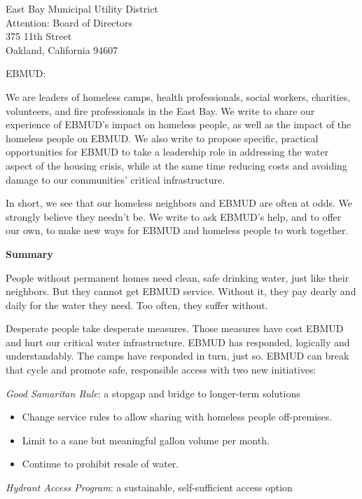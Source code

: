\documentclass[letterpaper]{letter}
\begin{document}
  \begin{letter}{%
    East Bay Municipal Utility District\\
    Attention: Board of Directors\\
    375 11th Street\\
    Oakland, California 94607}

    \opening{EBMUD:}

    We are leaders of homeless camps, health professionals, social workers, charities, volunteers, and fire professionals in the East Bay. We write to share our experience of EBMUD’s impact on homeless people, as well as the impact of the homeless people on EBMUD. We also write to propose specific, practical opportunities for EBMUD to take a leadership role in addressing the water aspect of the housing crisis, while at the same time reducing costs and avoiding damage to our communities’ critical infrastructure.

    In short, we see that our homeless neighbors and EBMUD are often at odds. We strongly believe they needn’t be. We write to ask EBMUD’s help, and to offer our own, to make new ways for EBMUD and homeless people to work together.

    \begin{samepage}
    \textbf{Summary}

    People without permanent homes need clean, safe drinking water, just like their neighbors. But they cannot get EBMUD service. Without it, they pay dearly and daily for the water they need. Too often, they suffer without.

    Desperate people take desperate measures. Those measures have cost EBMUD and hurt our critical water infrastructure. EBMUD has responded, logically and understandably. The camps have responded in turn, just so. EBMUD can break that cycle and promote safe, responsible access with two new initiatives:

    \emph{Good Samaritan Rule}: a stopgap and bridge to longer-term solutions

    \begin{itemize}
      \item Change service rules to allow sharing with homeless people off-premises.
      \item Limit to a sane but meaningful gallon volume per month.
      \item Continue to prohibit resale of water.
    \end{itemize}

    \emph{Hydrant Access Program}: a sustainable, self-sufficient access option


\end{samepage}
\end{letter}
\end{document}
